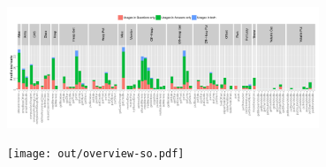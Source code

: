 \documentclass{article}
\begin{document}
\centering

\includegraphics[width=0.7\textwidth]{analysis/legend-so}

\texttt{[image: out/overview-so.pdf]}
\end{document}
